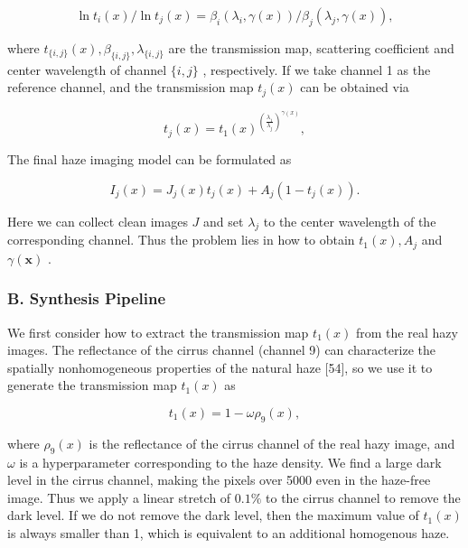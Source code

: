 \begin{equation}
\ln t_{i}(x)/\ln t_{j}(x)=\beta_{i}\left(\lambda_{i},\gamma(x)\right)/\beta_{j}\left(\lambda_{j},\gamma(x)\right),
\end{equation}

where $t_{\{i,j\}}(x),\beta_{\{i,j\}},\lambda_{\{i,j\}}$ are the transmission map, scattering coefficient and center wavelength of channel $\{i,j\}$ , respectively. If we take channel 1 as the reference channel, and the transmission map $t_{j}(x)$ can be obtained via

\begin{equation}
t_{j}(x)=t_{1}(x)^{\left(\frac{\lambda_{1}}{\lambda_{j}}\right)^{\gamma(x)}},
\end{equation}

The final haze imaging model can be formulated as

\begin{equation}
I_{j}(x)=J_{j}(x)t_{j}(x)+A_{j}\left(1-t_{j}(x)\right).
\end{equation}

Here we can collect clean images $J$ and set $\lambda_{j}$ to the center wavelength of the corresponding channel. Thus the problem lies in how to obtain $t_{1}(x),A_{j}$ and $\gamma(\boldsymbol{x})$ .

\subsubsection{B. Synthesis Pipeline}

We first consider how to extract the transmission map $t_{1}(x)$ from the real hazy images. The reflectance of the cirrus channel (channel 9) can characterize the spatially nonhomogeneous properties of the natural haze [54], so we use it to generate the transmission map $t_{1}(x)$ as

\begin{equation}
t_{1}(x)=1-\omega\rho_{9}(x),
\end{equation}

where $\rho_{9}(x)$ is the reflectance of the cirrus channel of the real hazy image, and $\omega$ is a hyperparameter corresponding to the haze density. We find a large dark level in the cirrus channel, making the pixels over 5000 even in the haze-free image. Thus we apply a linear stretch of $0.1\%$ to the cirrus channel to remove the dark level. If we do not remove the dark level, then the maximum value of $t_{1}(x)$ is always smaller than 1, which is equivalent to an additional homogenous haze.

